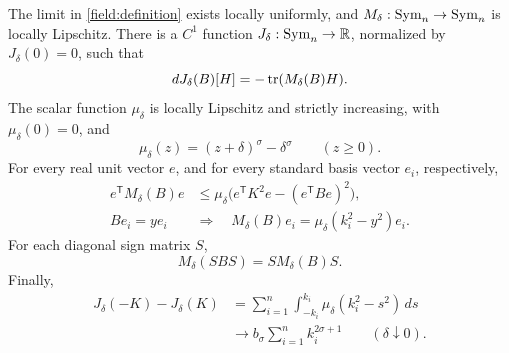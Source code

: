 \begin{proposition}\label{field:properties}
The limit in \eqref{field:definition} exists locally uniformly, and
$M_\delta:\operatorname{Sym}_n\to\operatorname{Sym}_n$ is locally Lipschitz.  There is a
$C^1$ function $J_\delta:\operatorname{Sym}_n\to\mathbb R$, normalized by
$J_\delta(0)=0$, such that
\begin{equation}\label{field:primitive}
 dJ_\delta(B)[H]=-\operatorname{tr}(M_\delta(B)H).
\end{equation}
The scalar function $\mu_\delta$ is locally Lipschitz and strictly
increasing, with $\mu_\delta(0)=0$, and
\begin{equation}\label{field:mu-positive}
       \mu_\delta(z)=(z+\delta)^\sigma-\delta^\sigma
       \qquad(z\geq0).
\end{equation}
For every real unit vector $e$, and for every standard basis vector
$e_i$, respectively,
\begin{align}
 e^{\mathsf T}M_\delta(B)e
  &\leq\mu_\delta\bigl(e^{\mathsf T}K^2e
                         -(e^{\mathsf T}Be)^2\bigr),
       \label{field:direction}\\
 Be_i=ye_i\quad&\Longrightarrow\quad
 M_\delta(B)e_i=\mu_\delta(k_i^2-y^2)e_i.
       \label{field:coordinate}
\end{align}
For each diagonal sign matrix $S$,
\begin{equation}\label{field:equivariance}
                 M_\delta(SBS)=SM_\delta(B)S.
\end{equation}
Finally,
\begin{equation}\label{field:endpoints}
 \begin{split}
 J_\delta(-K)-J_\delta(K)
 &=\sum_{i=1}^n\int_{-k_i}^{k_i}\mu_\delta(k_i^2-s^2)\,ds\\
 &\longrightarrow b_\sigma\sum_{i=1}^n k_i^{2\sigma+1}
       \qquad(\delta\downarrow0).
 \end{split}
\end{equation}
\end{proposition}

